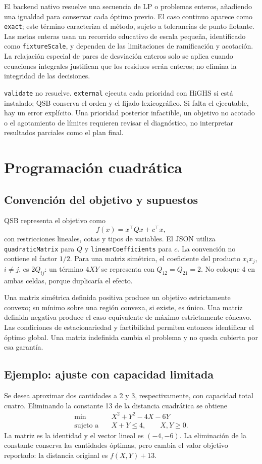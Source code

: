 El backend nativo resuelve una secuencia de LP o problemas enteros, añadiendo
una igualdad para conservar cada óptimo previo. El caso continuo aparece
como \texttt{exact}; este término caracteriza el método, sujeto a tolerancias
de punto flotante. Las metas enteras usan un recorrido educativo de escala
pequeña, identificado como \texttt{fixtureScale}, y dependen de las
limitaciones de ramificación y acotación. La relajación especial de pares de
desviación enteros solo se aplica cuando ecuaciones integrales justifican que
los residuos serán enteros; no elimina la integridad de las decisiones.

\texttt{validate} no resuelve. \texttt{external} ejecuta cada prioridad con
HiGHS si está instalado; QSB conserva el orden y el fijado lexicográfico.
Si falta el ejecutable, hay un error explícito. Una prioridad posterior
infactible, un objetivo no acotado o el agotamiento de límites requieren
revisar el diagnóstico, no interpretar resultados parciales como el plan final.

\section{Programación cuadrática}
\subsection{Convención del objetivo y supuestos}
QSB representa el objetivo como
\[
 f(x)=x^\top Qx+c^\top x,
\]
con restricciones lineales, cotas y tipos de variables. El JSON utiliza
\texttt{quadraticMatrix} para \(Q\) y \texttt{linearCoefficients} para \(c\).
La convención no contiene el factor \(1/2\). Para una matriz simétrica, el
coeficiente del producto \(x_ix_j\), \(i\ne j\), es \(2Q_{ij}\): un término
\(4XY\) se representa con \(Q_{12}=Q_{21}=2\). No coloque 4 en ambas
celdas, porque duplicaría el efecto.

Una matriz simétrica definida positiva produce un objetivo estrictamente
convexo; su mínimo sobre una región convexa, si existe, es único. Una matriz
definida negativa produce el caso equivalente de máximo estrictamente
cóncavo. Las condiciones de estacionariedad y factibilidad permiten entonces
identificar el óptimo global. Una matriz indefinida cambia el problema y no
queda cubierta por esa garantía.

\subsection{Ejemplo: ajuste con capacidad limitada}
Se desea aproximar dos cantidades a 2 y 3, respectivamente, con capacidad
total cuatro. Eliminando la constante 13 de la distancia cuadrática se obtiene
\[
\begin{aligned}
 \min\quad & X^2+Y^2-4X-6Y\\
 \text{sujeto a}\quad &X+Y\leq4,\qquad X,Y\geq0.
\end{aligned}
\]
La matriz es la identidad y el vector lineal es \((-4,-6)\). La eliminación
de la constante conserva las cantidades óptimas, pero cambia el valor
objetivo reportado: la distancia original es \(f(X,Y)+13\).

